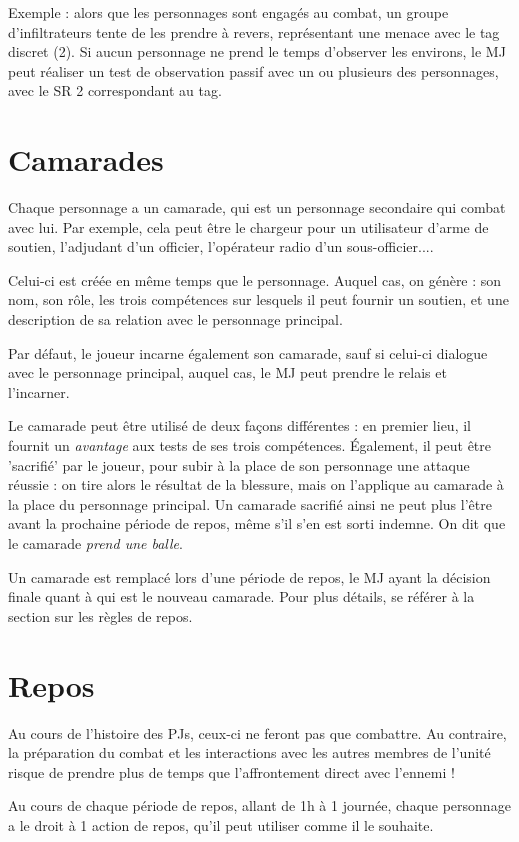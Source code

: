\documentclass{report}
\begin{document}
\begin{multicols}{2}
Exemple : alors que les personnages sont engagés au combat, un groupe d'infiltrateurs tente de les prendre à revers, représentant une menace avec le tag discret (2). Si aucun personnage ne prend le temps d'observer les environs, le MJ peut réaliser un test de observation passif avec un ou plusieurs des personnages, avec le SR 2 correspondant au tag.
\section{Camarades}
Chaque personnage a un camarade, qui est un personnage secondaire qui combat avec lui. Par exemple, cela peut être le chargeur pour un utilisateur d'arme de soutien, l'adjudant d'un officier, l'opérateur radio d'un sous-officier....

Celui-ci est créée en même temps que le personnage. Auquel cas, on génère : son nom, son rôle, les trois compétences sur lesquels il peut fournir un soutien, et une description de sa relation avec le personnage principal.

Par défaut, le joueur incarne également son camarade, sauf si celui-ci dialogue avec le personnage principal, auquel cas, le MJ peut prendre le relais et l'incarner.

Le camarade peut être utilisé de deux façons différentes : en premier lieu, il fournit un \emph{avantage} aux tests de ses trois compétences. Également, il peut être 'sacrifié' par le joueur, pour subir à la place de son personnage une attaque réussie : on tire alors le résultat de la blessure, mais on l'applique au camarade à la place du personnage principal. Un camarade sacrifié ainsi ne peut plus l'être avant la prochaine période de repos, même s'il s'en est sorti indemne. On dit que le camarade \emph{prend une balle}.

Un camarade est remplacé lors d'une période de repos, le MJ ayant la décision finale quant à qui est le nouveau camarade. Pour plus détails, se référer à la section sur les règles de repos.

\section{Repos}
Au cours de l'histoire des PJs, ceux-ci ne feront pas que combattre. Au contraire, la préparation du combat et les interactions avec les autres membres de l'unité risque de prendre plus de temps que l'affrontement direct avec l'ennemi !

Au cours de chaque période de repos, allant de 1h à 1 journée, chaque personnage a le droit à 1 action de repos, qu'il peut utiliser comme il le souhaite.


\end{multicols}
\end{document}
